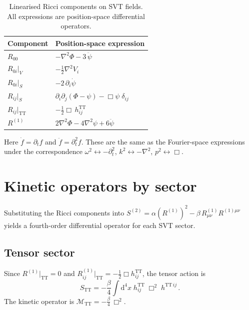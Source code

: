 \documentclass[11pt,a4paper]{article}
\newcommand{\dd}{\mathrm{d}}
\newcommand{\TT}{\mathrm{TT}}
\theoremstyle{definition}
\theoremstyle{remark}
\begin{document}
\begin{table}[ht]
\centering
\caption{Linearised Ricci components on SVT fields.  All expressions
are position-space differential operators.}
\label{tab:ricci}
\begin{tabular}{@{}ll@{}}
\toprule
Component & Position-space expression \\
\midrule
$R_{00}$ & $-\nabla^2\Phi - 3\,\ddot\psi$ \\[3pt]
$R_{0i}\big|_V$ & $-\frac{1}{2}\nabla^2 V_i$ \\[3pt]
$R_{0i}\big|_S$ & $-2\,\partial_i\dot\psi$ \\[3pt]
$R_{ij}\big|_S$ & $\partial_i\partial_j(\Phi-\psi) - \Box\psi\;\delta_{ij}$ \\[3pt]
$R_{ij}\big|_\TT$ & $-\frac{1}{2}\Box\, h^\TT_{ij}$ \\[3pt]
$R^{(1)}$ & $2\nabla^2\Phi - 4\nabla^2\psi + 6\ddot\psi$ \\
\bottomrule
\end{tabular}
\end{table}

Here $\dot f = \partial_t f$ and
$\ddot f = \partial_t^2 f$.  These are the same as the Fourier-space
expressions under the correspondence
$\omega^2 \leftrightarrow -\partial_t^2$,
$k^2 \leftrightarrow -\nabla^2$,
$p^2 \leftrightarrow \Box$.

\section{Kinetic operators by sector}
\label{sec:operators}

Substituting the Ricci components into $S^{(2)} = \alpha(R^{(1)})^2
- \beta\,R^{(1)}_{\mu\nu}R^{(1)\mu\nu}$ yields a fourth-order
differential operator for each SVT sector.

\subsection{Tensor sector}

Since $R^{(1)}|_\TT = 0$ and
$R^{(1)}_{ij}|_\TT = -\frac{1}{2}\Box h^\TT_{ij}$, the tensor
action is
\begin{equation}\label{eq:S-TT}
  \boxed{
  S_\TT = -\frac{\beta}{4}\int\dd^4x\;
    h^\TT_{ij}\;\Box^2\; h^{\TT\,ij}\,.}
\end{equation}
The kinetic operator is $\mathcal{M}_\TT = -\frac{\beta}{4}\,\Box^2$.
\end{document}
